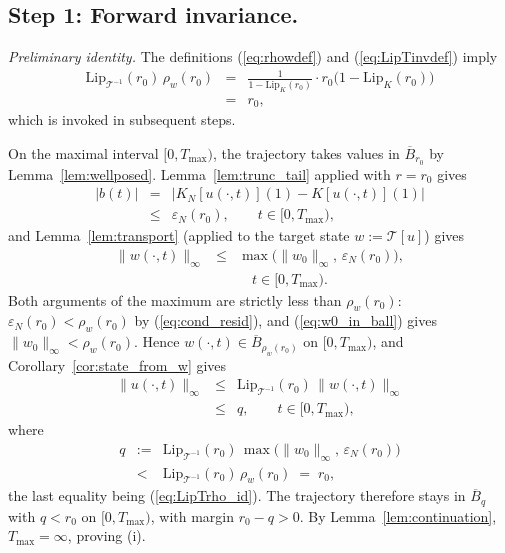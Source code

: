 \documentclass[10pt,a4paper]{amsart}
\newcommand{\Tcal}{\mathcal{T}}
\newcommand{\Lipk}{\mathrm{Lip}_K}
\newcommand{\LipT}{\mathrm{Lip}_{\Tcal^{-1}}}
\newcommand{\Bball}{\overline{B}}
\newcommand{\eps}{\varepsilon}
\begin{document}
\subsection*{Step 1: Forward invariance.}

\emph{Preliminary identity.} The definitions (\ref{eq:rhowdef}) and (\ref{eq:LipTinvdef}) imply
\begin{eqnarray}
\LipT(r_0)\,\rho_w(r_0) &=& \frac{1}{1 - \Lipk(r_0)}\cdot r_0\bigl(1 - \Lipk(r_0)\bigr) \nonumber \\
&=& r_0,
\label{eq:LipTrho_id}
\end{eqnarray}
which is invoked in subsequent steps.

On the maximal interval $[0, T_{\max})$, the trajectory takes values in $\overline B_{r_0}$ by Lemma~\ref{lem:wellposed}. Lemma~\ref{lem:trunc_tail} applied with $r = r_0$ gives
\begin{eqnarray}
|b(t)| &=& |K_N[u(\cdot,t)](1) - K[u(\cdot,t)](1)| \nonumber \\
&\le& \eps_N(r_0), \qquad t \in [0, T_{\max}),
\label{eq:bbound_invariant}
\end{eqnarray}
and Lemma~\ref{lem:transport} (applied to the target state $w := \Tcal[u]$) gives
\begin{eqnarray}
\|w(\cdot, t)\|_\infty &\le& \max\bigl(\|w_0\|_\infty,\, \eps_N(r_0)\bigr), \nonumber \\
&& \quad t \in [0, T_{\max}).
\label{eq:wnorm_invariant}
\end{eqnarray}
Both arguments of the maximum are strictly less than $\rho_w(r_0)$: $\eps_N(r_0) < \rho_w(r_0)$ by (\ref{eq:cond_resid}), and (\ref{eq:w0_in_ball}) gives $\|w_0\|_\infty < \rho_w(r_0)$. Hence $w(\cdot, t) \in \Bball_{\rho_w(r_0)}$ on $[0, T_{\max})$, and Corollary~\ref{cor:state_from_w} gives
\begin{eqnarray}
\|u(\cdot, t)\|_\infty &\le& \LipT(r_0)\,\|w(\cdot, t)\|_\infty \nonumber \\
&\le& q, \qquad t \in [0, T_{\max}),
\label{eq:unorm_strict}
\end{eqnarray}
where
\begin{eqnarray}
q &:=& \LipT(r_0)\,\max\bigl(\|w_0\|_\infty,\, \eps_N(r_0)\bigr) \nonumber \\
&<& \LipT(r_0)\,\rho_w(r_0) \;=\; r_0,
\label{eq:qdef}
\end{eqnarray}
the last equality being (\ref{eq:LipTrho_id}). The trajectory therefore stays in $\overline B_q$ with $q < r_0$ on $[0, T_{\max})$, with margin $r_0 - q > 0$. By Lemma~\ref{lem:continuation}, $T_{\max} = \infty$, proving (i).
\end{document}
